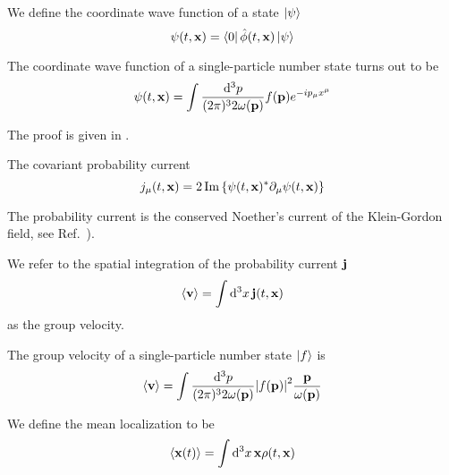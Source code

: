 \begin{definition}
	We define the coordinate wave function of a state $\ket{\psi}$
	\begin{equation}
		\psi(t,\vb{x})
		=
		\bra{0}\hat\phi(t,\vb{x})\ket{\psi}
	\end{equation}
\end{definition}
\begin{lemma}\label{thm:single_particle_number_state_wave_function}
	The coordinate wave function of a single-particle number state turns out to be
	\begin{equation}
		\psi(t,\vb{x})
		=
		\int\frac{\dd[3]{p}}{(2\pi)^32\omega(\vb{p})}
		f(\vb{p})e^{-ip_\mu x^\mu}
	\end{equation}
\end{lemma}
The proof is given in .
\begin{definition}
	The covariant probability current
	\begin{equation}
		j_\mu(t,\vb{x})
		=
		2
		\operatorname{\operatorname{Im}}\left\{
			\psi(t,\vb{x})^*
			\partial_\mu
			\psi(t,\vb{x})
		\right\}
		\label{eq:qkg_probability_current}
	\end{equation}	
\end{definition}
The probability current is the conserved Noether's current of the Klein-Gordon field, see Ref.~\cite[p.~18]{Peskin1995}).
\begin{definition}
	We refer to the spatial integration of the probability current $\vb{j}$
	\begin{equation}
		\expval{\vb{v}}
		=
		\int\dd[3]{x}
		\vb{j}(t,\vb{x})
		\label{eq:group_velocity}
	\end{equation}
	as the group velocity.
\end{definition}
\begin{lemma}
	The group velocity of a single-particle number state $\ket{f}$ is
	\begin{equation}
		\expval{\vb{v}}
		=
		\int\frac{\dd[3]{p}}{(2\pi)^32\omega(\vb{p})}
		\abs{f(\vb{p})}^2
		\frac{\vb{p}}{\omega(\vb{p})}
		\label{eq:single_particle_number_state_group_velocity}
	\end{equation}
\end{lemma}
\begin{definition}
	We define the mean localization to be
	\begin{equation}
		\expval{\vb{x}(t)}
		=
		\int\dd[3]{x}
		\vb{x}
		\rho(t,\vb{x})
	\end{equation}
\end{definition}
